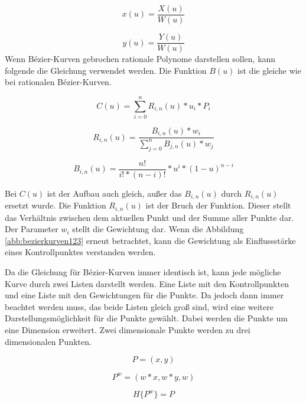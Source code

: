 \documentclass[11pt]{article}
\begin{document}
\begin{equation}
x(u) = \frac{X(u)}{W(u)}
\end{equation}

\begin{equation}
y(u) = \frac{Y(u)}{W(u)}
\end{equation}
Wenn Bézier-Kurven  gebrochen rationale Polynome darstellen sollen, kann folgende die Gleichung  verwendet werden.
Die Funktion $B(u)$ ist die gleiche wie bei rationalen Bézier-Kurven.

\begin{equation}
C(u) = \sum_{i=0}^{n} R_{i,n} (u) * u_{i} * P_{i}
\end{equation}

\begin{equation}
R_{i,n} (u) = \frac{B_{i,n} (u) * w_{i}}{\sum_{j=0}^{n} B_{j,n} (u) * w_{j}}
\end{equation}

\begin{equation}
B_{i,n} (u) = \frac{n!}{i! * (n-i)!} * u^{i} * (1-u)^{n-i}
\end{equation}

Bei $C(u)$ ist der Aufbau auch gleich, außer das $B_{i,n}(u)$ durch $R_{i,n}(u)$ ersetzt wurde. 
Die Funktion  $R_{i,n}(u)$ ist der Bruch der Funktion. 
Dieser stellt das Verhältnis zwischen dem aktuellen Punkt und der Summe aller Punkte dar. 
Der Parameter $w_{i}$ stellt die Gewichtung dar. 
Wenn die Abbildung \ref{abb:bezierkurven123} erneut betrachtet, kann die Gewichtung als Einflussstärke eines Kontrollpunktes verstanden werden. 

Da die Gleichung für Bézier-Kurven immer identisch ist, kann jede mögliche Kurve durch zwei Listen darstellt werden.
Eine Liste mit den Kontrollpunkten und eine Liste mit den Gewichtungen für die Punkte. 
Da jedoch dann immer beachtet werden muss, das beide Listen gleich groß sind, wird eine weitere Darstellungsmöglichkeit für die Punkte gewählt.
Dabei werden die Punkte um eine Dimension erweitert. 
Zwei dimensionale Punkte werden zu drei dimensionalen Punkten.

\begin{equation}
P = (x,y)
\end{equation}

\begin{equation}
P^w = (w*x, w*y, w)
\end{equation}

\begin{equation}
H\{P^w\} = P
\end{equation}
\end{document}
